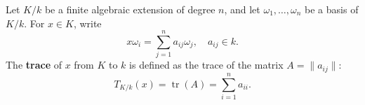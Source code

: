 Let $K/k$ be a finite algebraic extension of degree $n$, and let $\omega_1, \dots, \omega_n$ be a basis of $K/k$. For $x \in K$, write
$$x\omega_i = \sum_{j=1}^{n} a_{ij}\omega_j, \quad a_{ij} \in k.$$
The \textbf{trace} of $x$ from $K$ to $k$ is defined as the trace of the matrix $A = \|a_{ij}\|$:
$$T_{K/k}(x) = \operatorname{tr}(A) = \sum_{i=1}^{n} a_{ii}.$$
